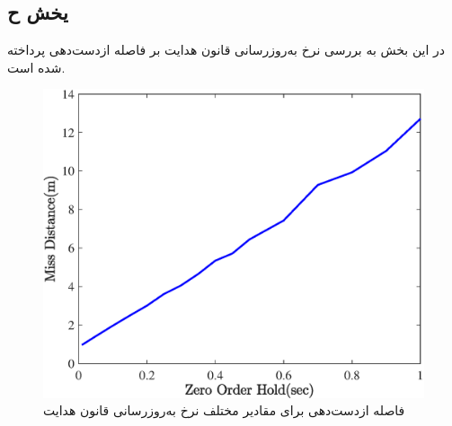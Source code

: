 \subsection{یخش ح}
در این بخش به بررسی نرخ به‌روزرسانی قانون هدایت بر فاصله‌ ازدست‌دهی پرداخته شده است.
\begin{figure}[H]
	\centering
	\includegraphics[width=.75\linewidth]{../Figure/Q1/h/MD}
	\caption{فاصله ازدست‌دهی برای مقادیر مختلف نرخ به‌روزرسانی قانون هدایت}
\end{figure}